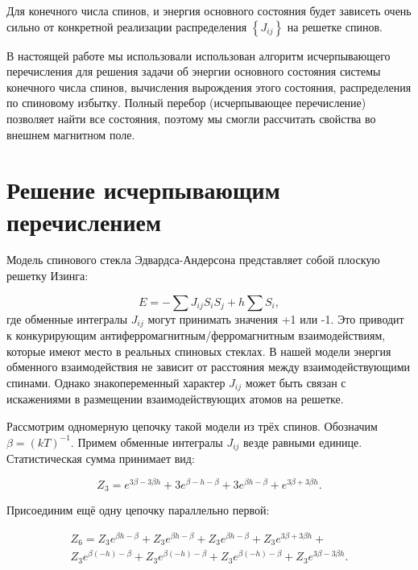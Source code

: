 \documentclass[utf8, babel, sor, jor, amsmath, amssymb, reprint]{elsarticle} %
\begin{document}
Для конечного числа спинов, и энергия основного состояния будет зависеть очень сильно от конкретной реализации распределения $\left\lbrace J_{ij} \right\rbrace $ на решетке спинов. 

В настоящей работе мы использовали использован алгоритм исчерпывающего перечисления \cite{padalko2021parallel} для решения задачи об энергии основного состояния системы конечного числа спинов, вычисления вырождения этого состояния, распределения по спиновому избытку. Полный перебор (исчерпывающее перечисление) позволяет найти все состояния, поэтому мы смогли рассчитать свойства во внешнем магнитном поле. 


\section{Решение исчерпывающим перечислением}

Модель спинового стекла Эдвардса-Андерсона представляет собой плоскую решетку Изинга:

\begin{equation}
	E = -\sum J_{ij} S_i S_j + h \sum S_i,
	\label{eq:ising_energy}
\end{equation}
где обменные интегралы $J_{ij}$ могут принимать значения +1 или -1. Это приводит к конкурирующим антиферромагнитным/ферромагнитным взаимодействиям, которые имеют место в реальных спиновых стеклах. В нашей модели энергия обменного взаимодействия не зависит от расстояния между взаимодействующими спинами. Однако знакопеременный характер $J_{ij}$ может быть связан с искажениями в размещении взаимодействующих атомов на решетке.

Рассмотрим одномерную цепочку такой модели из трёх спинов. Обозначим $\beta = (kT)^{-1}$. Примем обменные интегралы $J_{ij}$ везде равными единице. Статистическая сумма принимает вид:

\begin{equation}
	Z_3 = e^{3\beta - 3\beta h} + 3e^{\beta - h - \beta} + 3e^{\beta h - \beta} + e^{3\beta + 3\beta h}.
	\label{eq:stat_3}
\end{equation}

Присоединим ещё одну цепочку параллельно первой:

\begin{equation}
	\label{eq:stat_3_un}
	\begin{alignedat}{2}
		Z_6 = Z_3 e^{\beta  h-\beta }+Z_3 e^{\beta  h-\beta }+Z_3 e^{\beta  h-\beta }+Z_3 e^{3 \beta +3 \beta  h}+ \\
		Z_3 e^{\beta  (-h)-\beta }+Z_3 e^{\beta  (-h)-\beta }+Z_3 e^{\beta  (-h)-\beta }+Z_3 e^{3 \beta -3 \beta  h}.
	\end{alignedat}
\end{equation}
\end{document}
